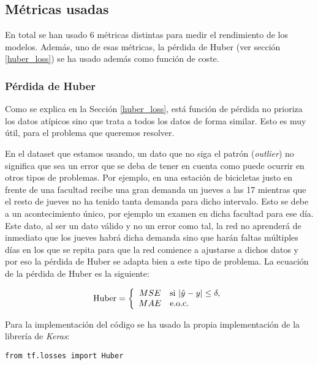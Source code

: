 \subsection{Métricas usadas}
En total se han usado 6 métricas distintas para medir el rendimiento de los modelos. Además, uno de esas métricas, la pérdida de Huber (ver sección \ref{huber_loss}) se ha usado además como función de coste.

\subsubsection{Pérdida de Huber}

Como se explica en la Sección \ref{huber_loss}, está función de pérdida no prioriza los datos atípicos sino que trata a todos los datos de forma similar. Esto es muy útil, para el problema que queremos resolver.

En el dataset que estamos usando, un dato que no siga el patrón (\textit{outlier}) no significa que sea un error que se deba de tener en cuenta como puede ocurrir en otros tipos de problemas. Por ejemplo, en una estación de bicicletas justo en frente de una facultad recibe una gran demanda un jueves a las 17 mientras que el resto de jueves no ha tenido tanta demanda para dicho intervalo. Esto se debe a un acontecimiento único, por ejemplo un examen en dicha facultad para ese día. Este dato, al ser un dato válido y no un error como tal, la red no aprenderá de inmediato que los jueves habrá dicha demanda sino que harán faltas múltiples días en los que se repita para que la red comience a ajustarse a dichos datos y por eso la pérdida de Huber se adapta bien a este tipo de problema. La ecuación de la pérdida de Huber es la siguiente:

\begin{equation}
\centering
    \begin{split}
    \text{Huber} = \left\{ 
        \begin{array}{cl} 
            MSE & \text{si }|\hat{y}-y| \le \delta, \\
            MAE & \text{e.o.c.}
        \end{array}\right.
    \end{split}
\end{equation}

Para la implementación del código se ha usado la propia implementación de la librería de \textit{Keras}:

\begin{verbatim}
from tf.losses import Huber
\end{verbatim}

